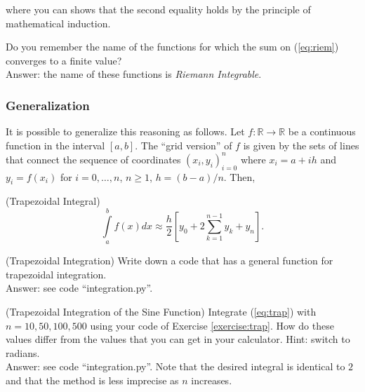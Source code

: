 \noindent where you can shows that the second equality holds by the principle of mathematical induction.

\begin{clue}
Do you remember the name of the functions for which the sum on (\ref{eq:riem}) converges to a finite value?\\
\noindent Answer: the name of these functions is \emph{Riemann Integrable}.
\end{clue}

\subsubsection{Generalization} \label{section:gen}
It is possible to generalize this reasoning as follows. Let $f: \mathbb{R} \rightarrow \mathbb{R}$ be a continuous function in the interval $[a,b]$. The ``grid version'' of $f$ is given by the sets of lines that connect the sequence of coordinates $(x_{i},y_{i})_{i=0}^{n}$ where $x_{i} = a + ih$ and $y_{i} = f(x_{i})$ for $i = 0, \ldots, n$, $n \geq 1$, $h = (b-a)/n$. Then,
\begin{definition} (Trapezoidal Integral)
\begin{equation}
\int \limits _{a} ^{b} f(x)dx \approx \frac{h}{2} \left[ y_{0} + 2 \sum \limits _{k=1} ^{n-1} y_{k} + y_{n}  \right].
\end{equation}
\end{definition}

\begin{exercise} (Trapezoidal Integration) \label{exercise:trap}
Write down a code that has a general function for trapezoidal integration.\\
\noindent Answer: see code ``integration.py''.
\end{exercise}

\begin{exercise} (Trapezoidal Integration of the Sine Function)
Integrate (\ref{eq:trap}) with $n=10,50,100,500$ using your code of Exercise \ref{exercise:trap}. How do these values differ from the values that you can get in your calculator. Hint: switch to radians.\\
\noindent  Answer: see code ``integration.py''. Note that the desired integral is identical to $2$ and that the method is less imprecise as $n$ increases.
\end{exercise}


